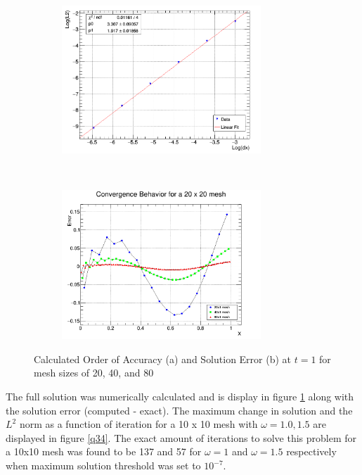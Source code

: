 \documentclass[paper=a4, fontsize=11pt, abstract=on]{scrartcl}
\numberwithin{equation}{section}		%
\numberwithin{figure}{section}			%
\numberwithin{table}{section}				%
\begin{document}
\begin{figure}[H]
        \centering
        \begin{subfigure}[h]{0.5\textwidth}
                \includegraphics[width = 7.5cm]{order}
                \caption{}
				
        \end{subfigure}%
       ~~~~~
        \begin{subfigure}[h]{0.5\textwidth}
                \includegraphics[width = 7.5cm]{qq22}
                \caption{}
                
        \end{subfigure}
        \caption{Calculated Order of Accuracy (a) and Solution Error (b) at $t=1$ for mesh sizes of 20, 40, and 80  }
        \label{3d}
\end{figure}




The full solution was numerically calculated and is display in figure \ref{3d} along with the solution error (computed - exact). The maximum change in solution and the $L^2$ norm as a function of iteration for a 10 x 10 mesh with $\omega = 1.0,1.5$ are displayed in figure \ref{q34}.  The exact amount of iterations to solve this problem for a 10x10 mesh was found to be 137 and 57 for $\omega = 1$ and $\omega = 1.5$ respectively when maximum solution threshold was set to $10^{-7}$. 
\end{document}
